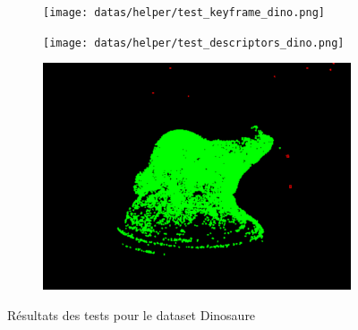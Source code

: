 \begin{figure}[ht]
    \centering
    \begin{subfigure}{0.7\textwidth}
        \texttt{[image: datas/helper/test\_keyframe\_dino.png]}
    \end{subfigure}

    \begin{subfigure}{0.7\textwidth}
        \texttt{[image: datas/helper/test\_descriptors\_dino.png]}
    \end{subfigure}

    \begin{subfigure}{0.7\textwidth}
        \includegraphics[width=\linewidth]{datas/helper/test_pointcloud_dino.png}
    \end{subfigure}

    \caption{Résultats des tests pour le dataset Dinosaure}
    \label{fig:test_dino}
\end{figure}

